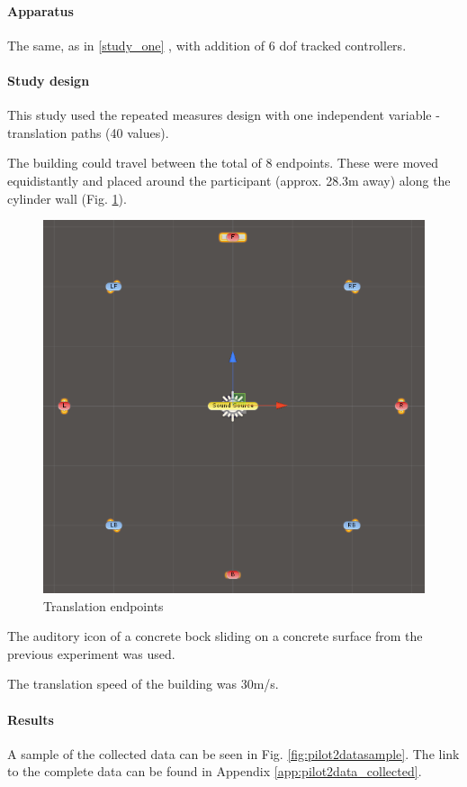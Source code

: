 \paragraph{Apparatus} The same, as in \ref{study_one} , with addition of 6 \gls{dof} tracked controllers.

\paragraph{Study design}
This study used the repeated measures design with one independent variable - translation paths (40 values).

The building could travel between the total of 8 endpoints. These were moved equidistantly and  placed around the participant (approx. 28.3m away) along the cylinder wall (Fig. \ref{fig:pilot2endpoints}).

\begin{figure}
	\centering
	\includegraphics[width=0.7\linewidth]{figures/pilot2_endpoints}
	\caption{Translation endpoints}
	\label{fig:pilot2endpoints}
\end{figure}


The auditory icon of a concrete bock sliding on a concrete surface from the previous experiment was used. 

The translation speed of the building was 30m/s.

\paragraph{Results}

A sample of the collected data can be seen in Fig. \ref{fig:pilot2datasample}. The link to the complete data can be found in Appendix \ref{app:pilot2data_collected}.

